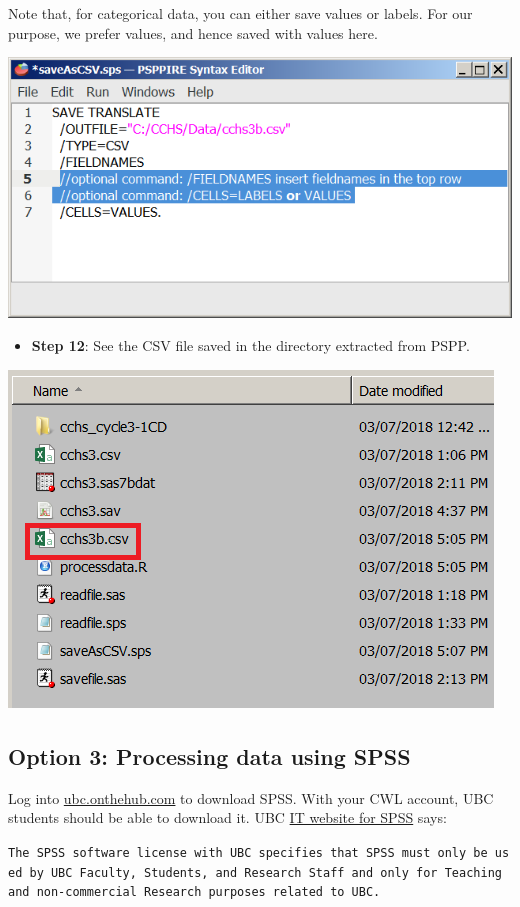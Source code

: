 \documentclass[
]{book}
\providecommand{\tightlist}{%
  \setlength{\itemsep}{0pt}\setlength{\parskip}{0pt}}
\begin{document}
Note that, for categorical data, you can either save values or labels. For our purpose, we prefer values, and hence saved with values here.

\includegraphics[width=0.65\linewidth]{images/abacus41}

\begin{itemize}
\tightlist
\item
  \textbf{Step 12}: See the CSV file saved in the directory extracted from PSPP.
\end{itemize}

\includegraphics[width=0.65\linewidth]{images/abacus42}

\hypertarget{option-3-processing-data-using-spss}{%
\subsection{Option 3: Processing data using SPSS}\label{option-3-processing-data-using-spss}}

Log into \href{https://ubc.onthehub.com}{ubc.onthehub.com} to download SPSS. With your CWL account, UBC students should be able to download it. UBC \href{https://it.ubc.ca/services/desktop-print-services/software-licensing/spss}{IT website for SPSS} says:

\texttt{The\ SPSS\ software\ license\ with\ UBC\ specifies\ that\ SPSS\ must\ only\ be\ used\ by\ UBC\ Faculty,\ Students,\ and\ Research\ Staff\ and\ only\ for\ Teaching\ and\ non-commercial\ Research\ purposes\ related\ to\ UBC.}
\end{document}
